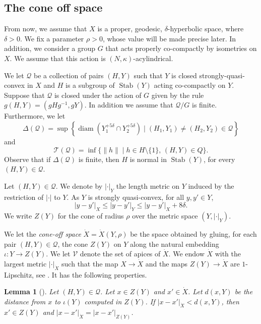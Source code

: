 \documentclass[11pt]{article}
\let\mathcal\mathscr
\theoremstyle{plain}
\newtheorem{lem}[thm]{Lemma}
\theoremstyle{definition}
\DeclareMathOperator{\diam}{diam}
\newcommand{\cX}{\dot{X}}
\newcommand{\stab}[1]{\operatorname{Stab}(#1)}
\begin{document}
\subsection{The cone off space}
From now, we assume that $X$ is a proper, geodesic, $\delta$\nobreakdash-hyperbolic space, where $\delta >0$.
We fix a parameter $\rho > 0$, whose value will be made precise later.
In addition, we consider a group $G$ that acts properly co-compactly by isometries on $X$.
We assume that this action is $(N,\kappa)$-acylindrical.

We let $\mathcal Q$ be a collection of pairs $(H, Y) $ such that $Y$ is closed strongly-quasi-convex
in $X$ and $H$ is a subgroup of $\stab Y$ acting co-compactly on $Y$.
Suppose that $\mathcal Q$ is closed under the action of $G$ given by the rule $g(H,Y)=(gHg^{-1}, gY)$.
In addition we assume that $\mathcal Q/G$ is finite.
Furthermore, we let
\begin{equation*}
\Delta(\mathcal Q) = \sup \left\{ \diam \left( Y_1^{+5\delta} \cap Y_2^{+5\delta} \right) \mid (H_1, Y_1) \neq (H_2,Y_2) \in \mathcal Q\right\}
\end{equation*}
and
\begin{equation*}
\mathcal{T}(\mathcal Q)=\inf \{\| h \|\mid h\in H \setminus \{1\},\, (H,Y) \in Q\}.
\end{equation*}
Observe that if $\Delta(\mathcal Q)$ is finite, then $H$ is normal in $\stab Y$, for every $(H,Y) \in \mathcal Q$.

Let $(H,Y) \in \mathcal Q$. We denote by $|\cdot|_Y$ the length metric on $Y$ induced by the restriction of $|\cdot|$ to $Y$.
As $Y$ is strongly quasi-convex, for all $y,y' \in Y$,
\[
|y-y'|_X\leqslant |y-y'|_Y\leqslant |y-y'|_X+ 8\delta.
\]
We write $Z(Y)$ for the cone of radius $\rho$ over the metric space $(Y, |\cdot|_Y)$.

We let the \emph{cone-off space} $\cX= \cX (Y,\rho)$ be the space obtained by gluing, for each pair $(H,Y)\in \mathcal Q$, the cone $Z(Y)$ on $Y$ along the natural embedding $\iota: Y \to Z(Y)$.
We let $\mathcal V$ denote the set of apices of $\cX$.
We endow $\cX$ with the largest metric $|\cdot|_{\cX}$ such that the map $X\to \cX$ and the maps $Z(Y)\to \cX$ are $1$-Lipschitz, see \cite[\S 5.1]{coulon_geometry_2014}. It has the following properties.

\begin{lem}[{\cite[Lem.\,5.7]{coulon_geometry_2014}}]\label{L: metric cone off 2}
Let $(H,Y) \in \mathcal Q$.
Let $x \in Z(Y)$ and $x' \in \cX$.
Let $d(x,Y)$ be the distance from $x$ to $\iota(Y)$ computed in $Z(Y)$.
If $|x-x'|_{\cX} < d(x, Y)$, then $x' \in Z(Y)$ and $|x-x'|_{\cX} = |x-x'|_{Z(Y)}$.
\end{lem}
\end{document}
